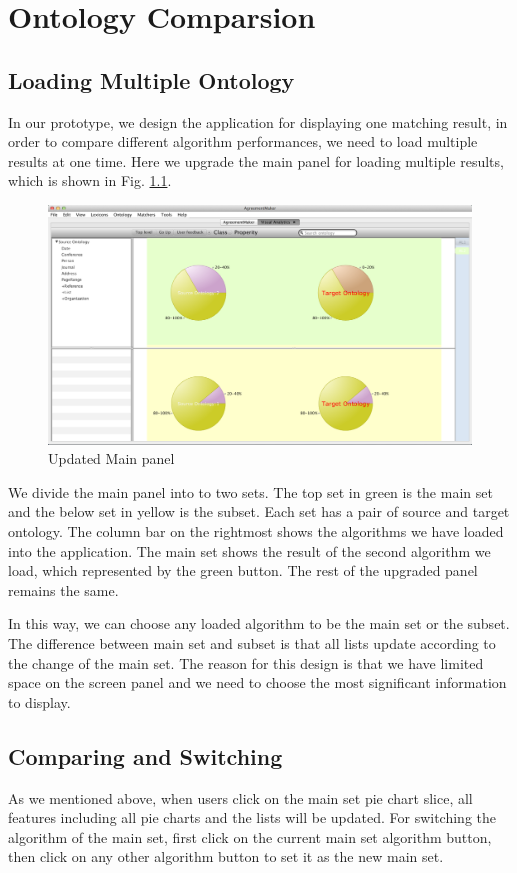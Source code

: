 \chapter{Ontology Comparsion}

\section{Loading Multiple Ontology} %
\label{sub:loading_multiple_ontology}
In our prototype, we design the application for displaying one matching result, in order to compare different algorithm performances, we need to load multiple results at one time. Here we upgrade the main panel for loading multiple results, which is shown in Fig. \ref{fig:updated_main_panel}. 

\begin{figure}[!ht]
	\centering
	\includegraphics[width=6.5in]{pics/gui2.png}
	\caption{Updated Main panel}
	\label{fig:updated_main_panel}
\end{figure}

We divide the main panel into to two sets. The top set in green is the main set and the below set in yellow is the subset. Each set has a pair of source and target ontology. The column bar on the rightmost shows the algorithms we have loaded into the application. The main set shows the result of the second algorithm we load, which represented by the green button. The rest of the upgraded panel remains the same.

In this way, we can choose any loaded algorithm to be the main set or the subset. The difference between main set and subset is that all lists update according to the change of the main set. The reason for this design is that we have limited space on the screen panel and we need to choose the most significant information to display.

\section{Comparing and Switching} %
\label{sub:comparing_and_switching}
As we mentioned above, when users click on the main set pie chart slice, all features including all pie charts and the lists will be updated. For switching the algorithm of the main set, first click on the current main set algorithm button, then click on any other algorithm button to set it as the new main set.
